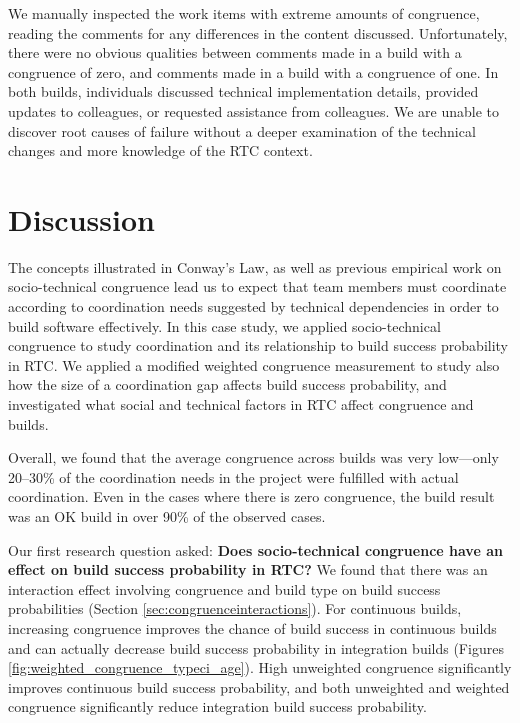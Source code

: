 We manually inspected the work items with extreme amounts of congruence, reading the comments for any differences in the content discussed. Unfortunately, there were no obvious qualities between comments made in a build with a congruence of zero, and comments made in a build with a congruence of one. In both builds, individuals discussed technical implementation details, provided updates to colleagues, or requested assistance from colleagues. We are unable to discover root causes of failure without a deeper examination of the technical changes and more knowledge of the RTC context.


\section{Discussion}
\label{sec:discussion}

The concepts illustrated in Conway's Law, as well as previous empirical work on socio-technical congruence lead us to expect that team members must coordinate according to coordination needs suggested by technical dependencies in order to build software effectively.
In this case study, we applied socio-technical congruence to study coordination and its relationship to build success probability in RTC. We applied a modified weighted congruence measurement to study also how the size of a coordination gap affects build success probability, and investigated what social and technical factors in RTC affect congruence and builds.

Overall, we found that the average congruence across builds was very low---only 20--30\% of the coordination needs in the project were fulfilled with actual coordination. Even in the cases where there is zero congruence, the build result was an OK build in over 90\% of the observed cases.

Our first research question asked:
\textbf{Does socio-technical congruence have an effect on build success probability in RTC?}
We found that there was an interaction effect involving congruence and build type on build success probabilities (Section \ref{sec:congruenceinteractions}). For continuous builds, increasing congruence improves the chance of build success in continuous builds and can actually decrease build success probability in integration builds (Figures \ref{fig:weighted_congruence_typeci_age}). High unweighted congruence significantly improves continuous build success probability, and both unweighted and weighted congruence significantly reduce integration build success probability.


